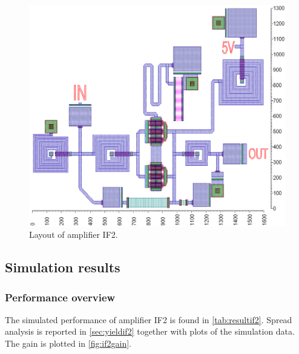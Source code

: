 			\begin{figure}[hbt!]
				\centering
				\includegraphics[width=1.0\textwidth]{fig/amplifiers/if2/layout}
				\caption[Amplifier IF2 layout.]{Layout of amplifier IF2.\scalemum}\label{fig:if2layout}
			\end{figure}

		\subsection{Simulation results}
			\subsubsection{Performance overview}
				The simulated performance of amplifier IF2 is found in \autoref{tab:resultif2}. Spread analysis is reported in \autoref{sec:yieldif2} together with plots of the simulation data. The gain is plotted in \autoref{fig:if2gain}.

